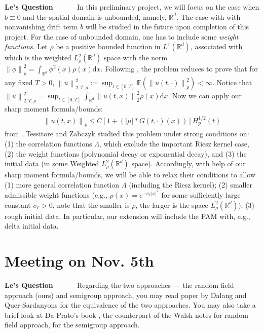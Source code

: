 \documentclass[a4paper,11pt]{article}
\theoremstyle{plain}
\theoremstyle{definition}
\newcommand{\E}{\mathbb{E}}
\newcommand{\ud}{\ensuremath{\mathrm{d}}}
\newcommand{\Norm}[1]{\left\|  #1   \right\|}
\newcommand{\R}{\mathbb{R}}
\newcounter{LQ}
\newenvironment{LeQuestion}[1][] %
  {\refstepcounter{LQ}
  \begin{mdframed}[backgroundcolor=red!10]\textbf{Le's Question \theLQ \: #1~~}~~~\noindent}%
  {\end{mdframed}}
\numberwithin{NQ}{section}
\numberwithin{LQ}{section}
\numberwithin{ZQ}{section}
\begin{document}
\begin{LeQuestion}
In this preliminary project, we will focus on the case when $b\equiv 0$ and the spatial domain is unbounded, namely, $\R^d$.  The case with with nonvanishing drift term $b$ will be studied in the future upon completion of this project.  
For the case of unbounded domain, one has to include some {\it weight functions}. 
Let $\rho$ be a positive bounded function in $L^1(\R^d)$, associated with which is the weighted $L^2_\rho(\R^d)$ space with the norm $\Norm{\phi}_\rho^2 = \int_{\R^d}\phi^2(x)\rho(x)\ud x$. Following \cite{TessitoreZabczyk98M}, the problem reduces to prove that for any fixed $T>0$, $\Norm{u}_{2,T,\rho}^2:=\sup_{t\in [0,T]}\E(\Norm{u(t,\cdot)}_\rho^2)<\infty$. Notice that $\Norm{u}_{2,T,\rho}^2=\sup_{t\in [0,T]}\int_{\R^d} \Norm{u(t,x)}_2^2 \rho(x)\ud x$. Now we can apply our sharp moment formula/bounds:
\begin{align}\label{E:MF-SHERD}
\Norm{u(t,x)}_p\le C \left[1+(|\mu|*G(t,\cdot)(x))\right] H_p^{1/2}(t)
\end{align}
from \cite{CH16Comparison}.
Tessitore and Zabczyk  \cite{TessitoreZabczyk98M} studied this problem under strong conditions on: (1) the correlation functions $\Lambda$, which exclude the important Riesz kernel case, (2) the weight functions (polynomial decay or exponential decay), and (3) the initial data (in some Weighted $L_\rho^2(\R^d)$ space). Accordingly, with help of our sharp moment formula/bounds, we will be able to relax their conditions to allow (1) more general correlation function $\Lambda$ (including the Riesz kernel); (2) smaller admissible weight functions (e.g., $\rho(x) = e^{-c_T |x|^2}$ for some sufficiently large constant $c_T>0$, note that the smaller is $\rho$, the larger is the space $L^2_\rho(\R^d)$); (3) rough initial data. In particular, our extension will include the PAM with, e.g., delta initial data. 
\end{LeQuestion}

\section{Meeting on Nov. 5th}
\begin{LeQuestion}
Regarding the two approaches --- the random field approach (ours) and semigroup approach, you may read paper by Dalang and Quer-Sardanyons \cite{DalangQuer} for the equivalence of the two approaches. You may also take a brief look at Da Prato's book \cite{DZ92}, the counterpart of the Walsh notes for random field approach, for the semigroup approach.  
\end{LeQuestion}
\end{document}
